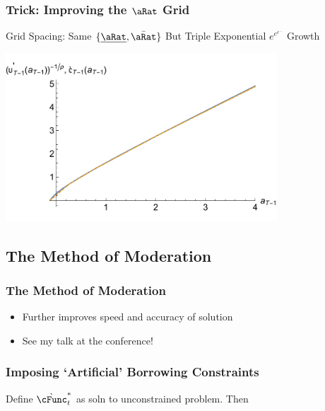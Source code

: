 \documentclass{beamer}
\begin{document}
\begin{frame}
\frametitle{Trick: Improving the $\aRat$ Grid}
Grid Spacing: Same $\{\uline{\aRat},\bar{\aRat}\}$ But Triple Exponential $e^{e^{e^{...}}}$ Growth

\includegraphics[width=4in]{./Figures/GothVInvVSGothCEEE.pdf}

\end{frame}


\subsection{The Method of Moderation}

\begin{frame}[label=MoM]
\frametitle{The Method of Moderation}

\begin{itemize}
\item Further improves speed and accuracy of solution
\item See my talk at the conference!
\end{itemize}

\end{frame}

\begin{frame}
\frametitle{Imposing `Artificial' Borrowing Constraints}


\pause 

Define $\grave{\cFunc}^{*}_{t}$ as soln to unconstrained problem.  Then


\end{frame}
\end{document}

